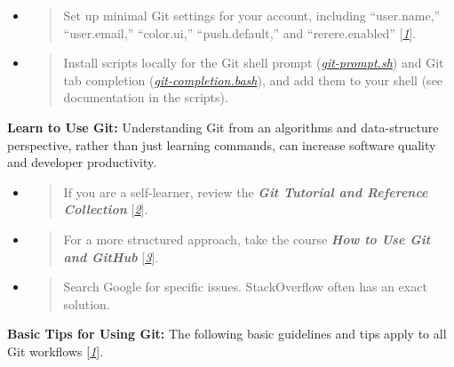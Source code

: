 \documentclass[]{article}
\begin{document}
\begin{itemize}
\item
  \begin{quote}
  Set up minimal Git settings for your account, including ``user.name,''
  ``user.email,'' ``color.ui,'' ``push.default,'' and ``rerere.enabled''
  {[}\protect\hyperlink{h.f53m6pxt4rgc}{\emph{1}}{]}.
  \end{quote}
\item
  \begin{quote}
  Install scripts locally for the Git shell prompt
  (\href{https://raw.github.com/git/git/master/contrib/completion/git-prompt.sh}{\emph{git-prompt.sh}})
  and Git tab completion
  (\href{https://raw.github.com/git/git/master/contrib/completion/git-completion.bash}{\emph{git-completion.bash}}),
  and add them to your shell (see documentation in the scripts).
  \end{quote}
\end{itemize}

\textbf{Learn to Use Git:} Understanding Git from an algorithms and
data-structure perspective, rather than just learning commands, can
increase software quality and developer productivity.

\begin{itemize}
\item
  \begin{quote}
  If you are a self-learner, review the \emph{\textbf{Git Tutorial and
  Reference Collection}}
  {[}\protect\hyperlink{id.dpuheqwt966g}{\emph{2}}{]}.
  \end{quote}
\item
  \begin{quote}
  For a more structured approach, take the course \emph{\textbf{How to
  Use Git and GitHub}}
  {[}\protect\hyperlink{id.91we93wr27j3}{\emph{3}}{]}.
  \end{quote}
\item
  \begin{quote}
  Search Google for specific issues. StackOverflow often has an exact
  solution.
  \end{quote}
\end{itemize}

\textbf{Basic Tips for Using Git:} The following basic guidelines and
tips apply to all Git workflows
{[}\protect\hyperlink{h.f53m6pxt4rgc}{\emph{1}}{]}.
\end{document}
